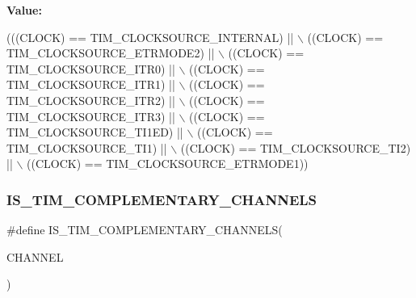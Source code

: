 {\bfseries Value\+:}
\begin{DoxyCode}
(((CLOCK) == TIM\_CLOCKSOURCE\_INTERNAL) || \(\backslash\)
                                   ((CLOCK) == TIM\_CLOCKSOURCE\_ETRMODE2) || \(\backslash\)
                                   ((CLOCK) == TIM\_CLOCKSOURCE\_ITR0)     || \(\backslash\)
                                   ((CLOCK) == TIM\_CLOCKSOURCE\_ITR1)     || \(\backslash\)
                                   ((CLOCK) == TIM\_CLOCKSOURCE\_ITR2)     || \(\backslash\)
                                   ((CLOCK) == TIM\_CLOCKSOURCE\_ITR3)     || \(\backslash\)
                                   ((CLOCK) == TIM\_CLOCKSOURCE\_TI1ED)    || \(\backslash\)
                                   ((CLOCK) == TIM\_CLOCKSOURCE\_TI1)      || \(\backslash\)
                                   ((CLOCK) == TIM\_CLOCKSOURCE\_TI2)      || \(\backslash\)
                                   ((CLOCK) == TIM\_CLOCKSOURCE\_ETRMODE1))
\end{DoxyCode}
\mbox{\label{group___t_i_m___i_s___t_i_m___definitions_ga88b715bb44f7d3622500f23fafe5598a}} 
\subsubsection{\texorpdfstring{I\+S\+\_\+\+T\+I\+M\+\_\+\+C\+O\+M\+P\+L\+E\+M\+E\+N\+T\+A\+R\+Y\+\_\+\+C\+H\+A\+N\+N\+E\+LS}{IS\_TIM\_COMPLEMENTARY\_CHANNELS}}
{\footnotesize\ttfamily \#define I\+S\+\_\+\+T\+I\+M\+\_\+\+C\+O\+M\+P\+L\+E\+M\+E\+N\+T\+A\+R\+Y\+\_\+\+C\+H\+A\+N\+N\+E\+LS(\begin{DoxyParamCaption}\item[{}]{C\+H\+A\+N\+N\+EL }\end{DoxyParamCaption})}

